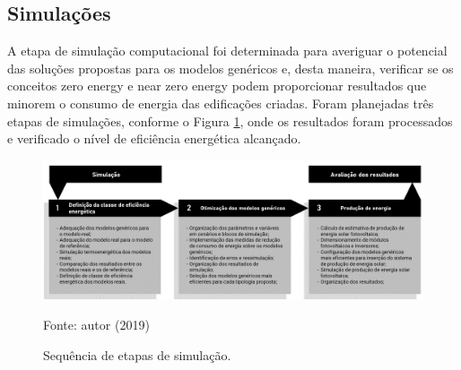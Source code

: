 \subsection{Simulações}
\noindent A etapa de simulação computacional foi determinada para averiguar o potencial das soluções propostas para os modelos genéricos e, desta maneira, verificar se os conceitos zero energy e near zero energy podem proporcionar resultados que minorem o consumo de energia das edificações criadas.\vspace*{0.3cm} \newline
\noindent Foram planejadas três etapas de simulações, conforme o Figura \ref{fig:figura14}, onde os resultados foram processados e verificado o nível de eficiência energética alcançado.
\begin{figure}[H]
    \centering
    \caption{Sequência de etapas de simulação.}
    \includegraphics[width=1.0\textwidth]{figures/fig14-fluxograma-3.jpg}
    \begin{flushleft}
        \par \small Fonte: autor (2019)
    \end{flushleft}
    \label{fig:figura14}
\end{figure}



